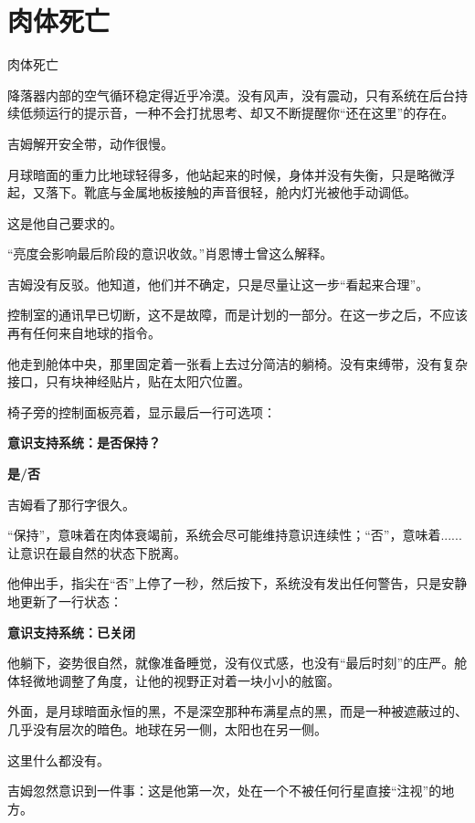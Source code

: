 \chapter{肉体死亡}

肉体死亡

降落器内部的空气循环稳定得近乎冷漠。没有风声，没有震动，只有系统在后台持续低频运行的提示音，一种不会打扰思考、却又不断提醒你“还在这里”的存在。

吉姆解开安全带，动作很慢。

月球暗面的重力比地球轻得多，他站起来的时候，身体并没有失衡，只是略微浮起，又落下。靴底与金属地板接触的声音很轻，舱内灯光被他手动调低。

这是他自己要求的。

“亮度会影响最后阶段的意识收敛。”肖恩博士曾这么解释。

吉姆没有反驳。他知道，他们并不确定，只是尽量让这一步“看起来合理”。

控制室的通讯早已切断，这不是故障，而是计划的一部分。在这一步之后，不应该再有任何来自地球的指令。

他走到舱体中央，那里固定着一张看上去过分简洁的躺椅。没有束缚带，没有复杂接口，只有块神经贴片，贴在太阳穴位置。

椅子旁的控制面板亮着，显示最后一行可选项：

\begin{center}
\textbf{意识支持系统：是否保持？}
\end{center}

\begin{center}
\textbf{是/否}
\end{center}

吉姆看了那行字很久。

“保持”，意味着在肉体衰竭前，系统会尽可能维持意识连续性；“否”，意味着......让意识在最自然的状态下脱离。

他伸出手，指尖在“否”上停了一秒，然后按下，系统没有发出任何警告，只是安静地更新了一行状态：

\begin{center}
\textbf{意识支持系统：已关闭}
\end{center}

他躺下，姿势很自然，就像准备睡觉，没有仪式感，也没有“最后时刻”的庄严。舱体轻微地调整了角度，让他的视野正对着一块小小的舷窗。

外面，是月球暗面永恒的黑，不是深空那种布满星点的黑，而是一种被遮蔽过的、几乎没有层次的暗色。地球在另一侧，太阳也在另一侧。

这里什么都没有。

吉姆忽然意识到一件事：这是他第一次，处在一个不被任何行星直接“注视”的地方。

